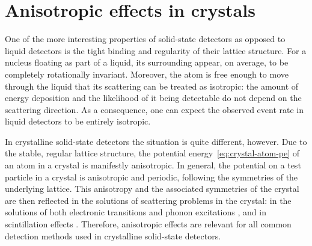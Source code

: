 \section{Anisotropic effects in crystals}

One of the more interesting properties of solid-state detectors as opposed to liquid detectors is the tight binding and regularity of their lattice structure. For a nucleus floating as part of a liquid, its surrounding appear, on average, to be completely rotationally invariant. Moreover, the atom is free enough to move through the liquid that its scattering can be treated as isotropic: the amount of energy deposition and the likelihood of it being detectable do not depend on the scattering direction. As a consequence, one can expect the observed event rate in liquid detectors to be entirely isotropic.

In crystalline solid-state detectors the situation is quite different, however. Due to the stable, regular lattice structure, the potential energy~\eqref{eq:crystal-atom-pe} of an atom in a crystal is manifestly anisotropic. In general, the potential on a test particle in a crystal is anisotropic and periodic, following the symmetries of the underlying lattice. This anisotropy and the associated symmetries of the crystal are then reflected in the solutions of scattering problems in the crystal: in the solutions of both electronic transitions and phonon excitations \parencite{TrickleEtAl2020}, and in scintillation effects \parencite{SekiyaEtAl2003}. Therefore, anisotropic effects are relevant for all common detection methods used in crystalline solid-state detectors.

